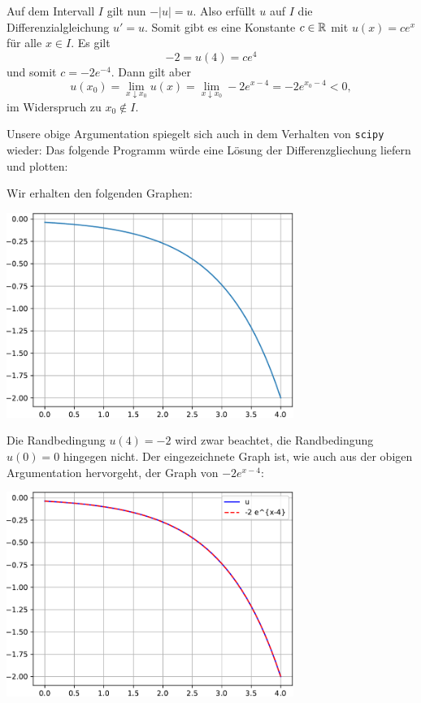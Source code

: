 Auf dem Intervall $I$ gilt nun $-|u| = u$.
Also erfüllt $u$ auf $I$ die Differenzialgleichung $u' = u$.
Somit gibt es eine Konstante $c \in \mathbb{R}$ mit $u(x) = c e^x$ für alle $x \in I$.
Es gilt
\[
    -2
  = u(4)
  = c e^4
\]
und somit $c = -2 e^{-4}$.
Dann gilt aber
\[
    u(x_0)
  = \lim_{x \downarrow x_0} u(x)
  = \lim_{x \downarrow x_0} -2 e^{x-4}
  = -2 e^{x_0-4}
  < 0,
\]
im Widerspruch zu $x_0 \notin I$.

Unsere obige Argumentation spiegelt sich auch in dem Verhalten von \texttt{scipy} wieder:
Das folgende Programm würde eine Lösung der Differenzgliechung liefern und plotten:



Wir erhalten den folgenden Graphen:

\begin{center}
  \includegraphics[width = 0.7\textwidth]{chapter_04/exercise_04_22_figure_1.pdf}
\end{center}

Die Randbedingung $u(4) = -2$ wird zwar beachtet, die Randbedingung $u(0) = 0$ hingegen nicht.
Der eingezeichnete Graph ist, wie auch aus der obigen Argumentation hervorgeht, der Graph von $-2 e^{x-4}$:

\begin{center}
  \includegraphics[width = 0.7\textwidth]{chapter_04/exercise_04_22_figure_2.pdf}
\end{center}














